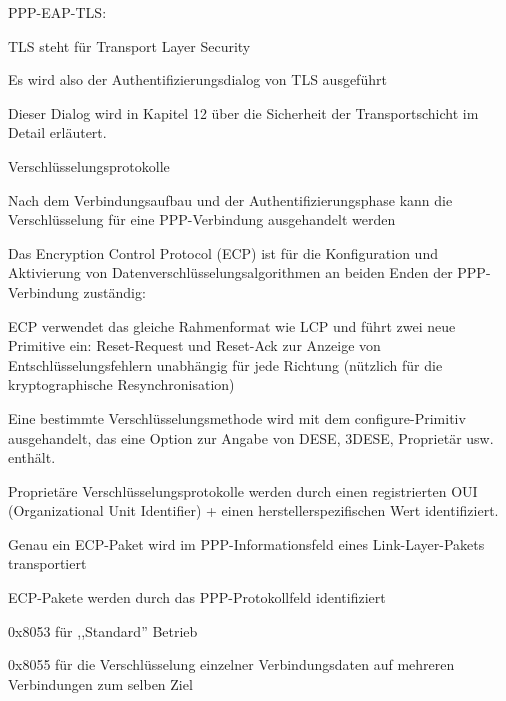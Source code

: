 \documentclass[a4paper]{article}
\begin{document}
\begin{multicols}{3}
\begin{itemize*}
            \item PPP-EAP-TLS:
            \begin{itemize*}
                  \item TLS steht für Transport Layer Security
                  \item Es wird also der Authentifizierungsdialog von TLS ausgeführt
                  \item Dieser Dialog wird in Kapitel 12 über die Sicherheit der Transportschicht im Detail erläutert.
            \end{itemize*}
      \end{itemize*}

      Verschlüsselungsprotokolle
      \begin{itemize*}
            \item Nach dem Verbindungsaufbau und der Authentifizierungsphase kann die Verschlüsselung für eine PPP-Verbindung ausgehandelt werden
            \begin{itemize*}
                  \item Das Encryption Control Protocol (ECP) ist für die Konfiguration und Aktivierung von Datenverschlüsselungsalgorithmen an beiden Enden der PPP-Verbindung zuständig:
                  \begin{itemize*}
                        \item ECP verwendet das gleiche Rahmenformat wie LCP und führt zwei neue Primitive ein: Reset-Request und Reset-Ack zur Anzeige von Entschlüsselungsfehlern unabhängig für jede Richtung (nützlich für die kryptographische Resynchronisation)
                        \item Eine bestimmte Verschlüsselungsmethode wird mit dem configure-Primitiv ausgehandelt, das eine Option zur Angabe von DESE, 3DESE, Proprietär usw. enthält.
                        \item Proprietäre Verschlüsselungsprotokolle werden durch einen registrierten OUI (Organizational Unit Identifier) + einen herstellerspezifischen Wert identifiziert.
                        \item Genau ein ECP-Paket wird im PPP-Informationsfeld eines Link-Layer-Pakets transportiert
                        \item ECP-Pakete werden durch das PPP-Protokollfeld identifiziert
                        \begin{itemize*}
                              \item 0x8053 für ,,Standard'' Betrieb
                              \item 0x8055 für die Verschlüsselung einzelner Verbindungsdaten auf mehreren Verbindungen zum selben Ziel

\end{itemize*}
\end{itemize*}
\end{itemize*}
\end{itemize*}
\end{multicols}
\end{document}

